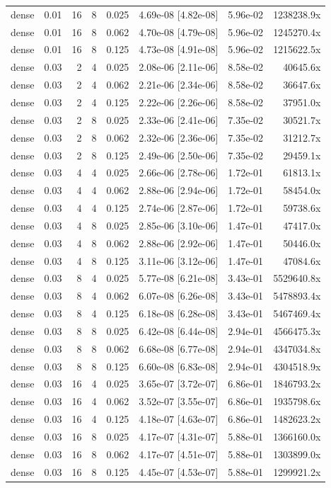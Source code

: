 \begin{tabular}{lrrrrrrr}
dense & 0.01 & 16 & 8 & 0.025 & 4.69e-08 [4.82e-08] & 5.96e-02 & 1238238.9x \\
dense & 0.01 & 16 & 8 & 0.062 & 4.70e-08 [4.79e-08] & 5.96e-02 & 1245270.4x \\
dense & 0.01 & 16 & 8 & 0.125 & 4.73e-08 [4.91e-08] & 5.96e-02 & 1215622.5x \\
dense & 0.03 & 2 & 4 & 0.025 & 2.08e-06 [2.11e-06] & 8.58e-02 & 40645.6x \\
dense & 0.03 & 2 & 4 & 0.062 & 2.21e-06 [2.34e-06] & 8.58e-02 & 36647.6x \\
dense & 0.03 & 2 & 4 & 0.125 & 2.22e-06 [2.26e-06] & 8.58e-02 & 37951.0x \\
dense & 0.03 & 2 & 8 & 0.025 & 2.33e-06 [2.41e-06] & 7.35e-02 & 30521.7x \\
dense & 0.03 & 2 & 8 & 0.062 & 2.32e-06 [2.36e-06] & 7.35e-02 & 31212.7x \\
dense & 0.03 & 2 & 8 & 0.125 & 2.49e-06 [2.50e-06] & 7.35e-02 & 29459.1x \\
dense & 0.03 & 4 & 4 & 0.025 & 2.66e-06 [2.78e-06] & 1.72e-01 & 61813.1x \\
dense & 0.03 & 4 & 4 & 0.062 & 2.88e-06 [2.94e-06] & 1.72e-01 & 58454.0x \\
dense & 0.03 & 4 & 4 & 0.125 & 2.74e-06 [2.87e-06] & 1.72e-01 & 59738.6x \\
dense & 0.03 & 4 & 8 & 0.025 & 2.85e-06 [3.10e-06] & 1.47e-01 & 47417.0x \\
dense & 0.03 & 4 & 8 & 0.062 & 2.88e-06 [2.92e-06] & 1.47e-01 & 50446.0x \\
dense & 0.03 & 4 & 8 & 0.125 & 3.11e-06 [3.12e-06] & 1.47e-01 & 47084.6x \\
dense & 0.03 & 8 & 4 & 0.025 & 5.77e-08 [6.21e-08] & 3.43e-01 & 5529640.8x \\
dense & 0.03 & 8 & 4 & 0.062 & 6.07e-08 [6.26e-08] & 3.43e-01 & 5478893.4x \\
dense & 0.03 & 8 & 4 & 0.125 & 6.18e-08 [6.28e-08] & 3.43e-01 & 5467469.4x \\
dense & 0.03 & 8 & 8 & 0.025 & 6.42e-08 [6.44e-08] & 2.94e-01 & 4566475.3x \\
dense & 0.03 & 8 & 8 & 0.062 & 6.68e-08 [6.77e-08] & 2.94e-01 & 4347034.8x \\
dense & 0.03 & 8 & 8 & 0.125 & 6.60e-08 [6.83e-08] & 2.94e-01 & 4304518.9x \\
dense & 0.03 & 16 & 4 & 0.025 & 3.65e-07 [3.72e-07] & 6.86e-01 & 1846793.2x \\
dense & 0.03 & 16 & 4 & 0.062 & 3.52e-07 [3.55e-07] & 6.86e-01 & 1935798.6x \\
dense & 0.03 & 16 & 4 & 0.125 & 4.18e-07 [4.63e-07] & 6.86e-01 & 1482623.2x \\
dense & 0.03 & 16 & 8 & 0.025 & 4.17e-07 [4.31e-07] & 5.88e-01 & 1366160.0x \\
dense & 0.03 & 16 & 8 & 0.062 & 4.17e-07 [4.51e-07] & 5.88e-01 & 1303899.0x \\
dense & 0.03 & 16 & 8 & 0.125 & 4.45e-07 [4.53e-07] & 5.88e-01 & 1299921.2x \\
\bottomrule
\end{tabular}
